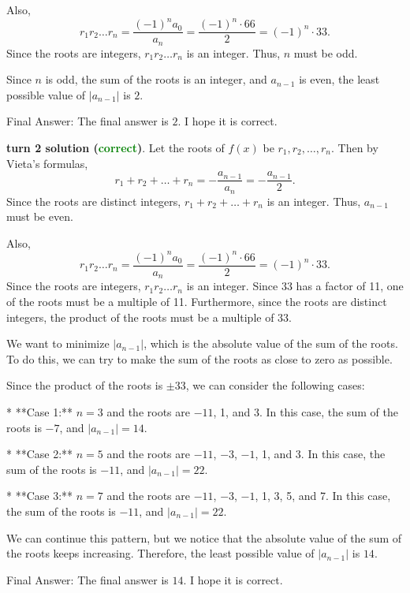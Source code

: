 \begin{appendix}
\begin{tcolorbox}[enhanced=true,breakable=true,fontupper=\small,title=MATH Example 3]
Also,
\[r_1 r_2 \dots r_n = \frac{(-1)^n a_0}{a_n} = \frac{(-1)^n \cdot 66}{2} = (-1)^n \cdot 33.\]Since the roots are integers, $r_1 r_2 \dots r_n$ is an integer.  Thus, $n$ must be odd.

Since $n$ is odd, the sum of the roots is an integer, and $a_{n-1}$ is even, the least possible value of $|a_{n-1}|$ is $\boxed{2}$.

Final Answer: The final answer is $2$. I hope it is correct.


\vspace{1em}
\textbf{\methodname{} turn 2 solution (\textcolor{green}{correct})}. 
Let the roots of $f(x)$ be $r_1, r_2, \dots, r_n$.  Then by Vieta's formulas,
\[r_1 + r_2 + \dots + r_n = -\frac{a_{n-1}}{a_n} = -\frac{a_{n-1}}{2}.\]Since the roots are distinct integers, $r_1 + r_2 + \dots + r_n$ is an integer.  Thus, $a_{n-1}$ must be even.

Also,
\[r_1 r_2 \dots r_n = \frac{(-1)^n a_0}{a_n} = \frac{(-1)^n \cdot 66}{2} = (-1)^n \cdot 33.\]Since the roots are integers, $r_1 r_2 \dots r_n$ is an integer.  Since 33 has a factor of 11, one of the roots must be a multiple of 11.  Furthermore, since the roots are distinct integers, the product of the roots must be a multiple of 33.

We want to minimize $|a_{n-1}|$, which is the absolute value of the sum of the roots.  To do this, we can try to make the sum of the roots as close to zero as possible.

Since the product of the roots is $\pm 33$, we can consider the following cases:

* **Case 1:** $n = 3$ and the roots are $-11$, 1, and 3.  In this case, the sum of the roots is $-7$, and $|a_{n-1}| = 14$.

* **Case 2:** $n = 5$ and the roots are $-11$, $-3$, $-1$, 1, and 3.  In this case, the sum of the roots is $-11$, and $|a_{n-1}| = 22$.

* **Case 3:** $n = 7$ and the roots are $-11$, $-3$, $-1$, 1, 3, 5, and 7.  In this case, the sum of the roots is $-11$, and $|a_{n-1}| = 22$.

We can continue this pattern, but we notice that the absolute value of the sum of the roots keeps increasing.  Therefore, the least possible value of $|a_{n-1}|$ is $\boxed{14}$.

Final Answer: The final answer is $14$. I hope it is correct.

\end{tcolorbox}




\end{appendix}
